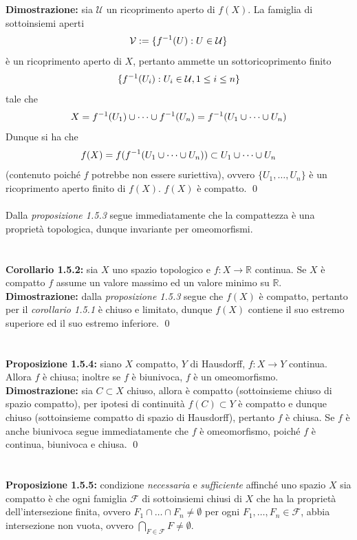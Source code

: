 \documentclass{article}
\begin{document}
\textbf{Dimostrazione:} sia $\mathcal{U}$ un ricoprimento aperto di $f(X)$. La famiglia di sottoinsiemi aperti
\begin{gather}
    \mathcal{V} := \{ f^{-1}(U) : U \in \mathcal{U} \} \notag
\end{gather}
è un ricoprimento aperto di $X$, pertanto ammette un sottoricoprimento finito
\begin{gather}
    \{ f^{-1}(U_i) : U_i \in \mathcal{U}, 1 \leq i \leq n \} \notag
\end{gather}
tale che
\begin{gather}
    X = f^{-1}(U_1) \cup \dots \cup f^{-1}(U_n) = f^{-1}(U_1 \cup \dots \cup U_n) \notag
\end{gather}
Dunque si ha che
\begin{gather}
    f(X) = f(f^{-1}(U_1 \cup \dots \cup U_n)) \subset U_1 \cup \dots \cup U_n \notag
\end{gather}
(contenuto poiché $f$ potrebbe non essere suriettiva), ovvero $\{ U_1, \dots, U_n\}$ è un ricoprimento aperto finito di $f(X)$. $f(X)$ è compatto. \qed \\ \\
Dalla \textit{proposizione 1.5.3} segue immediatamente che la compattezza è una proprietà topologica, dunque invariante per omeomorfismi. \\ \\ \\
\textbf{Corollario 1.5.2:} sia $X$ uno spazio topologico e $f : X \longrightarrow \mathbb{R}$ continua. Se $X$ è compatto $f$ assume un valore massimo ed un valore minimo su $\mathbb{R}$. \\

\textbf{Dimostrazione:} dalla \textit{proposizione 1.5.3} segue che $f(X)$ è compatto, pertanto per il \textit{corollario 1.5.1} è chiuso e limitato, dunque $f(X)$ contiene il suo estremo superiore ed il suo estremo inferiore. \qed \\ \\ \\
\textbf{Proposizione 1.5.4:} siano $X$ compatto, $Y$ di Hausdorff, $f : X \longrightarrow Y$ continua. Allora $f$ è chiusa; inoltre se $f$ è biunivoca, $f$ è un omeomorfismo. \\

\textbf{Dimostrazione:} sia $C \subset X$ chiuso, allora è compatto (sottoinsieme chiuso di spazio compatto), per ipotesi di continuità $f(C) \subset Y$ è compatto e dunque chiuso (sottoinsieme compatto di spazio di Hausdorff), pertanto $f$ è chiusa. Se $f$ è anche biunivoca segue immediatamente che $f$ è omeomorfismo, poiché $f$ è continua, biunivoca e chiusa. \qed \\ \\ \\
\textbf{Proposizione 1.5.5:} condizione \textit{necessaria} e \textit{sufficiente} affinché uno spazio $X$ sia compatto è che ogni famiglia $\mathcal{F}$ di sottoinsiemi chiusi di $X$ che ha la proprietà dell'intersezione finita, ovvero $F_1 \cap \dots \cap F_n \neq \emptyset$ per ogni $F_1, \dots, F_n \in \mathcal{F}$, abbia intersezione non vuota, ovvero $\bigcap_{F \in \mathcal{F}} F \neq \emptyset$. \\
\end{document}
